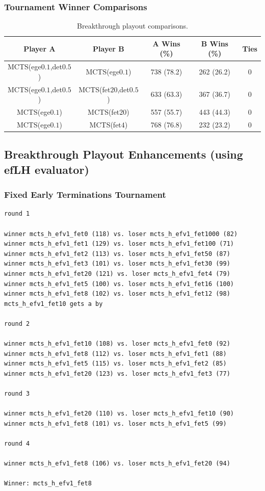 \documentclass{article}
\begin{document}
\subsubsection{Tournament Winner Comparisons}

\begin{table}[h!]
\begin{center}
\begin{tabular}{|c|c|ccc|}
\hline
Player A & Player B                             & A Wins (\%)  & B Wins (\%)  & Ties \\ 
\hline
MCTS(ege$0.1$,det$0.5$) & MCTS(ege$0.1$)        & 738 (78.2)   & 262 (26.2)   & 0    \\
MCTS(ege$0.1$,det$0.5$) & MCTS(fet$20$,det$0.5$) & 633 (63.3)   & 367 (36.7)   & 0    \\
MCTS(ege$0.1$)          & MCTS(fet$20$)          & 557 (55.7)   & 443 (44.3)   & 0    \\
MCTS(ege$0.1$)          & MCTS(fet$4$)           & 768 (76.8)   & 232 (23.2)   & 0    \\
\hline
\end{tabular}
\end{center}
\caption{Breakthrough playout comparisons.}
\end{table}

\subsection{Breakthrough Playout Enhancements (using efLH evaluator)}

\subsubsection{Fixed Early Terminations Tournament}

\begin{verbatim}
round 1

winner mcts_h_efv1_fet0 (118) vs. loser mcts_h_efv1_fet1000 (82)
winner mcts_h_efv1_fet1 (129) vs. loser mcts_h_efv1_fet100 (71)
winner mcts_h_efv1_fet2 (113) vs. loser mcts_h_efv1_fet50 (87)
winner mcts_h_efv1_fet3 (101) vs. loser mcts_h_efv1_fet30 (99)
winner mcts_h_efv1_fet20 (121) vs. loser mcts_h_efv1_fet4 (79)
winner mcts_h_efv1_fet5 (100) vs. loser mcts_h_efv1_fet16 (100)
winner mcts_h_efv1_fet8 (102) vs. loser mcts_h_efv1_fet12 (98)
mcts_h_efv1_fet10 gets a by

round 2

winner mcts_h_efv1_fet10 (108) vs. loser mcts_h_efv1_fet0 (92)
winner mcts_h_efv1_fet8 (112) vs. loser mcts_h_efv1_fet1 (88)
winner mcts_h_efv1_fet5 (115) vs. loser mcts_h_efv1_fet2 (85)
winner mcts_h_efv1_fet20 (123) vs. loser mcts_h_efv1_fet3 (77)

round 3

winner mcts_h_efv1_fet20 (110) vs. loser mcts_h_efv1_fet10 (90)
winner mcts_h_efv1_fet8 (101) vs. loser mcts_h_efv1_fet5 (99)

round 4

winner mcts_h_efv1_fet8 (106) vs. loser mcts_h_efv1_fet20 (94)

Winner: mcts_h_efv1_fet8
\end{verbatim}
\end{document}
